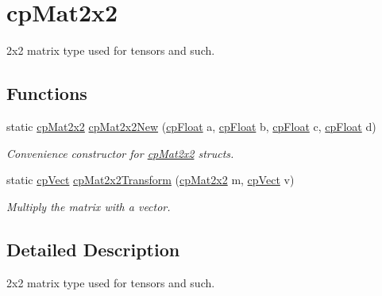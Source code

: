 \hypertarget{group__cp_mat2x2}{}\section{cp\+Mat2x2}
\label{group__cp_mat2x2}


2x2 matrix type used for tensors and such.  


\subsection*{Functions}
\begin{DoxyCompactItemize}
\item 
\hypertarget{group__cp_mat2x2_gad17af848b9fcff29d7806c48a78b07fc}{}static \hyperlink{structcp_mat2x2}{cp\+Mat2x2} \hyperlink{group__cp_mat2x2_gad17af848b9fcff29d7806c48a78b07fc}{cp\+Mat2x2\+New} (\hyperlink{group__basic_types_gac1ed65573e035bf892505768c852d8d3}{cp\+Float} a, \hyperlink{group__basic_types_gac1ed65573e035bf892505768c852d8d3}{cp\+Float} b, \hyperlink{group__basic_types_gac1ed65573e035bf892505768c852d8d3}{cp\+Float} c, \hyperlink{group__basic_types_gac1ed65573e035bf892505768c852d8d3}{cp\+Float} d)\label{group__cp_mat2x2_gad17af848b9fcff29d7806c48a78b07fc}

\begin{DoxyCompactList}\small\item\em Convenience constructor for \hyperlink{structcp_mat2x2}{cp\+Mat2x2} structs. \end{DoxyCompactList}\item 
\hypertarget{group__cp_mat2x2_gaa14635329b51a3307cc211d6f9dc1040}{}static \hyperlink{structcp_vect}{cp\+Vect} \hyperlink{group__cp_mat2x2_gaa14635329b51a3307cc211d6f9dc1040}{cp\+Mat2x2\+Transform} (\hyperlink{structcp_mat2x2}{cp\+Mat2x2} m, \hyperlink{structcp_vect}{cp\+Vect} v)\label{group__cp_mat2x2_gaa14635329b51a3307cc211d6f9dc1040}

\begin{DoxyCompactList}\small\item\em Multiply the matrix with a vector. \end{DoxyCompactList}\end{DoxyCompactItemize}


\subsection{Detailed Description}
2x2 matrix type used for tensors and such. 

